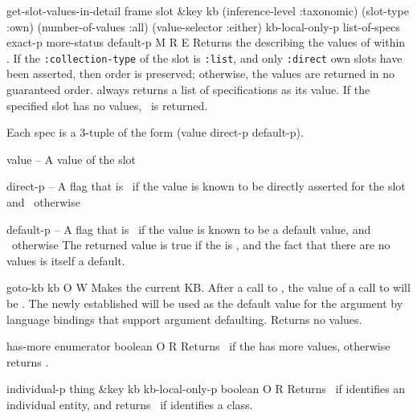 \begin{okbcop}{get-slot-values-in-detail}{ frame slot \&key kb (inference-level :taxonomic) (slot-type :own) (number-of-values :all) (value-selector :either) kb-local-only-p} { list-of-specs exact-p more-status default-p } { M } { R } { E }
Returns the  describing the values
   of  within .  If the {\tt :collection-type} 
   of the slot is {\tt :list}, and only {\tt :direct} own slots have been 
   asserted, then order is preserved; otherwise, the values are returned in 
   no guaranteed order.  always returns a
   list of specifications as its  value.  If the specified
   slot has no values, \emptylist\ is returned.

   Each spec is a 3-tuple of the form (value direct-p default-p).
   \bitem
   \item value -- A value of the slot
   \item direct-p -- A flag that is \true\ if the value is known to be
                      directly asserted for the slot and \false\ otherwise 
   \item default-p -- A flag that is \true\ if the value is known to be
                       a default value, and \false\ otherwise
   \eitem
   The  returned value is true if the 
   is \emptylist, and the fact that there are no values is itself a default.
\end{okbcop}

\begin{okbcop}{goto-kb}{ kb} { \void } { O } { W } {  }
Makes  the current KB.  After a call to , the value
   of a call to  will be .  The newly established
    will be used as the default value for the 
   argument by language bindings that support argument defaulting.  Returns
   no values.
\end{okbcop}

\begin{okbcop}{has-more}{ enumerator} { boolean } { O } { R } {  }
Returns \true\ if the  has more values, otherwise
   returns \false.
\end{okbcop}

\begin{okbcop}{individual-p}{ thing \&key kb kb-local-only-p} { boolean } { O } { R } {  }
Returns \true\ if  identifies an individual entity, and
   returns \false\ if  identifies a class.
\end{okbcop}

